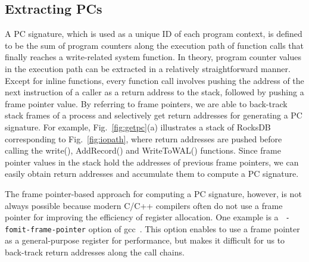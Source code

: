 \subsection{Extracting PCs}
\vspace{-5pt}
A PC signature, which is used as a unique ID of each program context,
is defined
to be the sum of program counters along the execution path of function calls
that finally reaches a write-related system function.  In theory, program
counter values in the execution path can be extracted in a relatively
straightforward manner.  Except for inline functions, every function call
involves pushing the address of the next instruction of a caller as a return
address to the stack, followed by pushing a frame pointer value.  By referring
to frame pointers, we are able to back-track stack frames of a process and
selectively get return addresses for generating a PC signature.
For example, Fig.~\ref{fig:getpc}(a) illustrates a stack of RocksDB corresponding
to Fig.~\ref{fig:iopath}, where return addresses are pushed before calling
the \textsf{\small  write()}, \textsf{\small AddRecord()} and \textsf{\small
WriteToWAL()} functions.  Since frame pointer values in the stack hold the
addresses of previous frame pointers, we can easily obtain return addresses and
accumulate them to compute a PC signature.  


The frame pointer-based approach for computing a PC signature, however, is not
always possible because modern C/C++ compilers often do not use a frame pointer
for improving the efficiency of register allocation.  One example is a {\tt
-fomit-frame-pointer} option of gcc~\cite{GCC}.  This option enables to use a frame
pointer as a general-purpose register for performance, but makes it difficult for us
to back-track return addresses along the call chains.  

